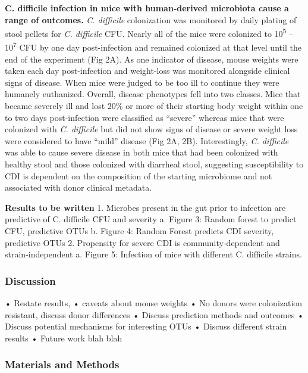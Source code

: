 \documentclass[]{article}
\begin{document}
\textbf{C. difficile infection in mice with human-derived microbiota
cause a range of outcomes.} \emph{C. difficile} colonization was
monitored by daily plating of stool pellets for \emph{C. difficile} CFU.
Nearly all of the mice were colonized to 10\textsuperscript{5} --
10\textsuperscript{7} CFU by one day post-infection and remained
colonized at that level until the end of the experiment (Fig 2A). As one
indicator of disease, mouse weights were taken each day post-infection
and weight-loss was monitored alongside clinical signs of disease. When
mice were judged to be too ill to continue they were humanely
euthanized. Overall, disease phenotypes fell into two classes. Mice that
became severely ill and lost 20\% or more of their starting body weight
within one to two days post-infection were classified as ``severe''
whereas mice that were colonized with \emph{C. difficile} but did not
show signs of disease or severe weight loss were considered to have
``mild'' disease (Fig 2A, 2B). Interestingly, \emph{C. difficile} was
able to cause severe disease in both mice that had been colonized with
healthy stool and those colonized with diarrheal stool, suggesting
susceptibility to CDI is dependent on the composition of the starting
microbiome and not associated with donor clinical metadata.

\textbf{Results to be written} 1. Microbes present in the gut prior to
infection are predictive of C. difficile CFU and severity a. Figure 3:
Random forest to predict CFU, predictive OTUs b. Figure 4: Random Forest
predicts CDI severity, predictive OTUs 2. Propensity for severe CDI is
community-dependent and strain-independent a. Figure 5: Infection of
mice with different C. difficile strains.

\subsubsection{Discussion}\label{discussion}

• Restate results, • caveats about mouse weights • No donors were
colonization resistant, discuss donor differences • Discuss prediction
methods and outcomes • Discuss potential mechanisms for interesting OTUs
• Discuss different strain results • Future work blah blah

\subsubsection{Materials and Methods}\label{materials-and-methods}
\end{document}
